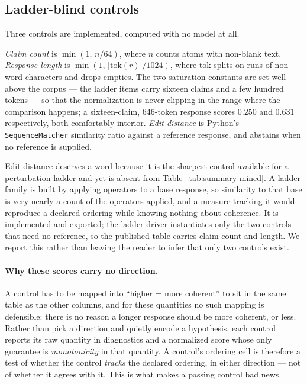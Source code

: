 \subsection{Ladder-blind controls}
\label{app-baseline-controls}

Three controls are implemented, computed with no model at all.

\emph{Claim count} is $\min(1,\,n/64)$, where $n$ counts atoms with non-blank text. \emph{Response
length} is $\min(1,\,|\mathrm{tok}(r)|/1024)$, where $\mathrm{tok}$ splits on runs of non-word
characters and drops empties. The two saturation constants are set well above the corpus --- the
ladder items carry sixteen claims and a few hundred tokens --- so that the normalization is never
clipping in the range where the comparison happens; a sixteen-claim, $646$-token response scores
$0.250$ and $0.631$ respectively, both comfortably interior. \emph{Edit distance} is Python's
\texttt{SequenceMatcher} similarity ratio against a reference response, and abstains when no reference
is supplied.

Edit distance deserves a word because it is the sharpest control available for a perturbation ladder
and yet is absent from Table~\ref{tab:summary-mined}. A ladder family is built by applying operators
to a base response, so similarity to that base is very nearly a count of the operators applied, and a
measure tracking it would reproduce a declared ordering while knowing nothing about coherence. It is
implemented and exported; the ladder driver instantiates only the two controls that need no reference,
so the published table carries claim count and length. We report this rather than leaving the reader
to infer that only two controls exist.

\paragraph{Why these scores carry no direction.} A control has to be mapped into ``higher = more
coherent'' to sit in the same table as the other columns, and for these quantities no such mapping is
defensible: there is no reason a longer response should be more coherent, or less. Rather than pick a
direction and quietly encode a hypothesis, each control reports its raw quantity in diagnostics and a
normalized score whose only guarantee is \emph{monotonicity} in that quantity. A control's ordering
cell is therefore a test of whether the control \emph{tracks} the declared ordering, in either
direction --- not of whether it agrees with it. This is what makes a passing control bad news.

